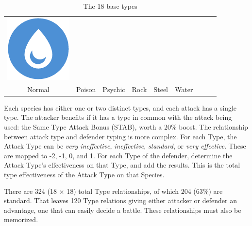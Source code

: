 \begin{table}[h!]
\begin{center}
\begin{tabular}{c c c c c c c c c}
  \includegraphics[scale=.25]{images/water.png} \\
  Normal & Poison & Psychic & Rock & Steel & Water \\
\end{tabular}
\end{center}
\caption{The 18 base types}
\end{table}

Each species has either one or two distinct types, and each attack has a single type.
The attacker benefits if it has a type in common with the attack being used:
 the Same Type Attack Bonus (STAB), worth a 20\% boost.
The relationship between attack type and defender typing is more complex.
For each Type, the Attack Type can be \textit{very ineffective},
 \textit{ineffective}, \textit{standard}, or \textit{very effective}.
These are mapped to -2, -1, 0, and 1.
For each Type of the defender, determine the Attack Type's effectiveness
 on that Type, and add the results.
This is the total type effectiveness of the Attack Type on that Species.

There are 324 (18 × 18) total Type relationships, of which 204 (63\%) are standard.
That leaves 120 Type relations giving either attacker or defender an advantage,
 one that can easily decide a battle.
These relationships must also be memorized.



